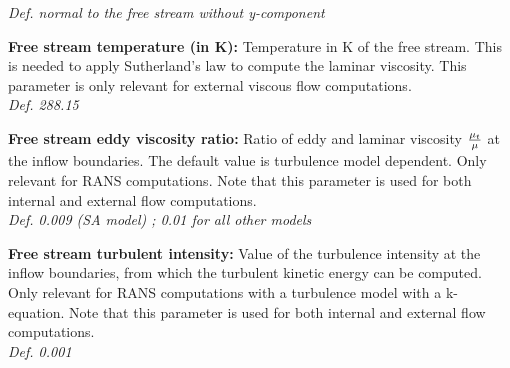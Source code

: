 \documentclass[12pt,epsf,colordvi]{article}
\begin{document}
\begin{description}
{\it Def. normal to the free stream without y-component}
%
    \item{\bf Free stream temperature (in K):} Temperature in K of the free stream. This is needed to apply Sutherland's law to compute the laminar viscosity.  This parameter is only relevant for external viscous flow computations.\\
{\it Def.  288.15 }
%
    \item{\bf Free stream eddy viscosity ratio: }Ratio of eddy and laminar viscosity \({\mu_t \over \mu } \) at the inflow boundaries. The default value is turbulence model dependent.  Only relevant for RANS computations. Note that this parameter is used for both internal and external flow computations.\\
{\it Def. 0.009 (SA model) ; 0.01 for all other models }
%
     \item{\bf Free stream turbulent intensity: }Value of the turbulence intensity at the inflow boundaries, from which the turbulent kinetic energy can be computed.  Only relevant for RANS computations with a turbulence model with a k-equation. Note that this parameter is used for both internal and external flow computations.  \\
{\it Def. 0.001 }
%
\end{description}
%
\noindent
\end{document}
